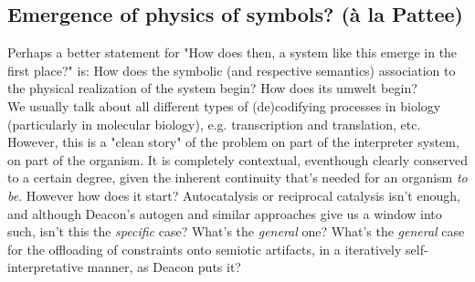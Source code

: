 \documentclass[a4paper,12pt,twoside,leqno]{article}
\begin{document}
\subsection*{Emergence of physics of symbols? (à la Pattee)}
Perhaps a better statement for "How does then, a system like this emerge in the first place?" is: How does the symbolic (and respective semantics) association to the physical realization of the system begin? How does its umwelt begin?\\
We usually talk about all different types of (de)codifying processes in biology (particularly in molecular biology), e.g. transcription and translation, etc. However, this is a "clean story" of the problem on part of the interpreter system, on part of the organism. It is completely contextual, eventhough clearly conserved to a certain degree, given the inherent continuity that's needed for an organism \textit{to be}. However how does it start? Autocatalysis or reciprocal catalysis isn't enough, and although Deacon's autogen and similar approaches give us a window into such, isn't this the \textit{specific} case? What's the \textit{general} one? What's the \textit{general} case for the offloading of constraints onto semiotic artifacts, in a iteratively self-interpretative manner, as Deacon puts it?
\end{document}
